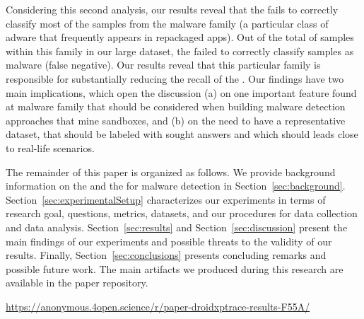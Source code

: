 Considering this second analysis, our results reveal that the \mas fails to correctly classify most of the samples from
the \gps malware family (a particular class of adware that frequently appears in repackaged apps). 
Out of the total of \appsGps samples within this family in our large dataset, the \mas failed to correctly classify \appsGpsFN samples as malware (false negative).
Our results reveal that this particular family is responsible for substantially reducing the recall of the \mas.
Our findings have two main implications, which open the discussion (a) on one important feature found at \gps malware family that should be
considered when building malware detection approaches that mine sandboxes, and (b) on the need to have a representative dataset, that should be labeled with sought
answers and which should leads close to real-life scenarios.
  

%


The remainder of this paper is organized as follows. 
We provide background information on the \mas and the \mas for malware detection in
Section~\ref{sec:background}. Section~\ref{sec:experimentalSetup}
characterizes our experiments in terms of research goal, questions, metrics, datasets, and our procedures for data collection and data analysis.
Section~\ref{sec:results} and Section~\ref{sec:discussion} present the main findings of our experiments and possible threats to the validity of our results. Finally,
Section~\ref{sec:conclusions} presents concluding remarks and possible future
work. The main artifacts we produced during this research are available in the
paper repository.

\begin{small}
  \begin{center}
    \url{https://anonymous.4open.science/r/paper-droidxptrace-results-F55A/}
  \end{center}
\end{small}
